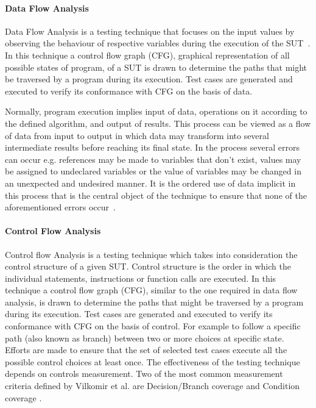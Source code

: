 \paragraph{Data Flow Analysis}
Data Flow Analysis is a testing technique that focuses on the input values by observing the behaviour of respective variables during the execution of the SUT~\cite{clarke1989formal}. In this technique a control flow graph (CFG), graphical representation of all possible states of program, of a SUT is drawn to determine the paths that might be traversed by a program during its execution. Test cases are generated and executed to verify its conformance with CFG on the basis of data. 

Normally, program execution implies input of data, operations on it according to the defined algorithm, and output of results. This process can be viewed as a flow of data from input to output in which data may transform into several intermediate results before reaching its final state. In the process several errors can occur e.g. references may be made to variables that don’t exist, values may be assigned to undeclared variables or the value of variables may be changed in an unexpected and undesired manner. It is the ordered use of data implicit in this process that is the central object of the technique to ensure that none of the aforementioned errors occur~\cite{fosdick1976data}.

\paragraph{Control Flow Analysis}
Control flow Analysis is a testing technique which takes into consideration the control structure of a given SUT. Control structure is the order in which the individual statements, instructions or function calls are executed. In this technique a control flow graph (CFG), similar to the one required in data flow analysis, is drawn to determine the paths that might be traversed by a program during its execution. Test cases are generated and executed to verify its conformance with CFG on the basis of control. For example to follow a specific path (also known as branch) between two or more choices at specific state. Efforts are made to ensure that the set of selected test cases execute all the possible control choices at least once. The effectiveness of the testing technique depends on controls measurement. Two of the most common measurement criteria defined by Vilkomir et al. are Decision/Branch coverage and Condition coverage \cite{vilkomir2003tolerance}. 

